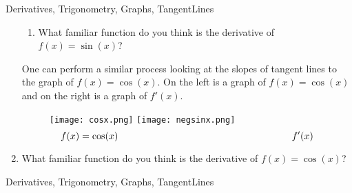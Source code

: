 \begin{tagblock}{Derivatives, Trigonometry, Graphs, TangentLines}
\begin{question}
\begin{enumerate}
\begin{enumerate}
\item What familiar function do you think is the derivative of $f(x)=\sin(x)$?

\end{enumerate}
\newpage

One can perform a similar process looking at the slopes of tangent lines to the graph of $f(x) = \cos(x)$.  On the left is a graph of $f(x) = \cos(x)$ and on the right is a graph of $f'(x)$.  
\begin{figure}[h]
\texttt{[image: cosx.png]} \hfill \texttt{[image: negsinx.png]}
\[f(x) = \cos(x) \hspace{2.5in} f'(x)\]

\end{figure}


\item What familiar function do you think is the derivative of $f(x)=\cos(x)$?


\end{enumerate}








	









	
	
\begin{tags}
	    Derivatives, Trigonometry, Graphs, TangentLines
\end{tags}
	
\begin{diary}
\end{diary}
	
\begin{solution}
	   
\end{solution}
	
\end{question}

\end{tagblock}


